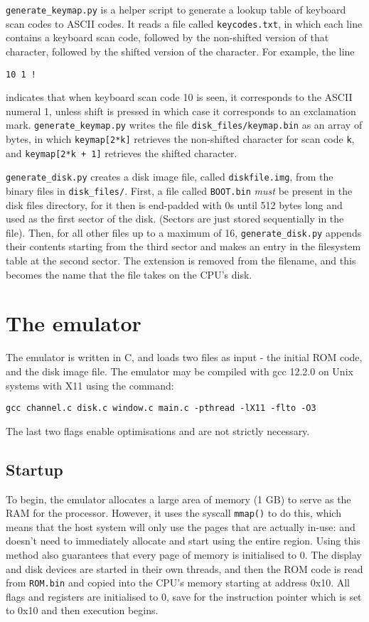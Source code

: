 \documentclass[12pt,a4paper]{report}
\begin{document}
\texttt{generate\_keymap.py} is a helper script to generate a lookup table of keyboard scan codes to ASCII codes. It reads a file called \texttt{keycodes.txt}, in which each line contains a keyboard scan code, followed by the non-shifted version of that character, followed by the shifted version of the character. For example, the line
\begin{verbatim}
10 1 !
\end{verbatim}
indicates that when keyboard scan code 10 is seen, it corresponds to the ASCII numeral 1, unless shift is pressed in which case it corresponds to an exclamation mark. \texttt{generate\_keymap.py} writes the file \texttt{disk\_files/keymap.bin} as an array of bytes, in which \texttt{keymap[2*k]} retrieves the non-shifted character for scan code \texttt{k}, and \texttt{keymap[2*k + 1]} retrieves the shifted character.

\texttt{generate\_disk.py} creates a disk image file, called \texttt{diskfile.img}, from the binary files in \texttt{disk\_files/}. First, a file called \texttt{BOOT.bin} \emph{must} be present in the disk files directory, for it then is end-padded with 0s until 512 bytes long and used as the first sector of the disk. (Sectors are just stored sequentially in the file). Then, for all other files up to a maximum of 16, \texttt{generate\_disk.py} appends their contents starting from the third sector and makes an entry in the filesystem table at the second sector. The extension is removed from the filename, and this becomes the name that the file takes on the CPU's disk.


\section{The emulator}

The emulator is written in C, and loads two files as input - the initial ROM code, and the disk image file. The emulator may be compiled with gcc 12.2.0 on Unix systems with X11 using the command:
\begin{verbatim}
gcc channel.c disk.c window.c main.c -pthread -lX11 -flto -O3
\end{verbatim}
The last two flags enable optimisations and are not strictly necessary.

\subsection*{Startup}

To begin, the emulator allocates a large area of memory (1 GB) to serve as the RAM for the processor. However, it uses the syscall \texttt{mmap()} to do this, which means that the host system will only use the pages that are actually in-use: and doesn't need to immediately allocate and start using the entire region. Using this method also guarantees that every page of memory is initialised to 0. The display and disk devices are started in their own threads, and then the ROM code is read from \texttt{ROM.bin} and copied into the CPU's memory starting at address 0x10. All flags and registers are initialised to 0, save for the instruction pointer which is set to 0x10 and then execution begins.
\end{document}

